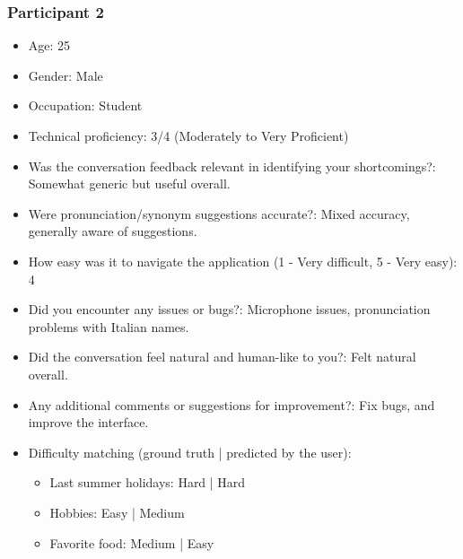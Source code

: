 \documentclass{article}
\begin{document}
\subsubsection{Participant 2}
\begin{itemize}
    \item Age: 25
    \item Gender: Male
    \item Occupation: Student
    \item Technical proficiency: 3/4 (Moderately to Very Proficient)
    \item Was the conversation feedback relevant in identifying your shortcomings?: Somewhat generic but useful overall.
    \item Were pronunciation/synonym suggestions accurate?: Mixed accuracy, generally aware of suggestions.
    \item How easy was it to navigate the application (1 - Very difficult, 5 - Very easy): 4
    \item Did you encounter any issues or bugs?: Microphone issues, pronunciation problems with Italian names.
    \item Did the conversation feel natural and human-like to you?: Felt natural overall.
    \item Any additional comments or suggestions for improvement?: Fix bugs, and improve the interface.
    \item Difficulty matching (ground truth | predicted by the user):
    \begin{itemize}
        \item Last summer holidays: Hard | Hard
        \item Hobbies: Easy | Medium
        \item Favorite food: Medium | Easy
    \end{itemize}
\end{itemize}
\end{document}
